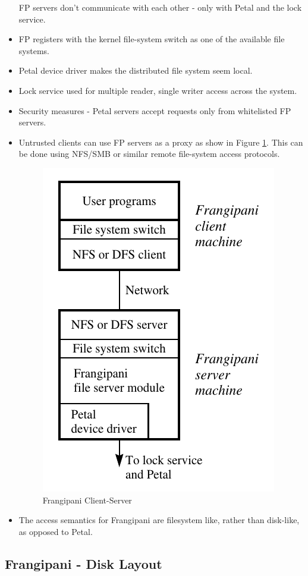\documentclass[parskip=half]{scrartcl}
\begin{document}
\begin{itemize}
            FP servers don't communicate with each other - only with Petal and the lock service.
            \item 
            FP registers with the kernel file-system switch as one of the available file systems.
            \item 
            Petal device driver makes the distributed file system seem local.
            \item 
            Lock service used for multiple reader, single writer access across the system.
            \item 
            Security measures - Petal servers accept requests only from whitelisted FP servers.
            \item 
            Untrusted clients can use FP servers as a proxy as show in Figure \ref{fig:frangipani-client-server}. This can be done using NFS/SMB or similar remote file-system access protocols.
            \begin{figure}[ht]
                \centering
                \includegraphics[width=.4\textwidth]{frangipani-client-server}
                \caption{Frangipani Client-Server}
                \label{fig:frangipani-client-server}
            \end{figure}
            \item 
            The access semantics for Frangipani are filesystem like, rather than disk-like, as opposed to Petal.
        \end{itemize}


    \subsection{Frangipani - Disk Layout} %
    \label{sub:frangipani_disk_layout}
    
\end{document}
